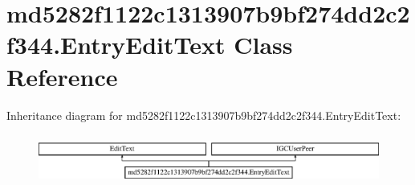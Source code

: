 \hypertarget{classmd5282f1122c1313907b9bf274dd2c2f344_1_1EntryEditText}{}\section{md5282f1122c1313907b9bf274dd2c2f344.\+Entry\+Edit\+Text Class Reference}
\label{classmd5282f1122c1313907b9bf274dd2c2f344_1_1EntryEditText}
Inheritance diagram for md5282f1122c1313907b9bf274dd2c2f344.\+Entry\+Edit\+Text\+:\begin{figure}[H]
\begin{center}
\leavevmode
\includegraphics[height=1.666667cm]{classmd5282f1122c1313907b9bf274dd2c2f344_1_1EntryEditText}
\end{center}
\end{figure}
